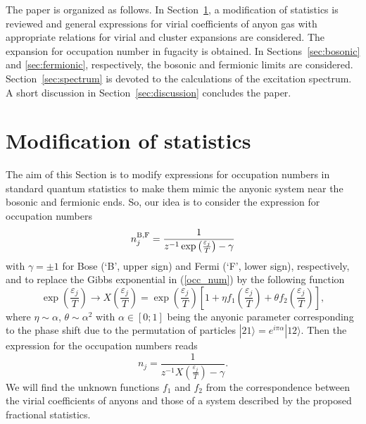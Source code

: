 \documentclass[12pt,a4paper]{article}
\def\eps{\varepsilon}
\begin{document}
The paper is organized as follows. In Section~\ref{sec:modif}, a modification of statistics is reviewed and general expressions for virial coefficients of anyon gas with appropriate relations for virial and cluster expansions are considered. The expansion for occupation number in fugacity is obtained. In Sections~\ref{sec:bosonic} and \ref{sec:fermionic}, respectively, the bosonic and fermionic limits are considered. Section~\ref{sec:spectrum} is devoted to the calculations of the excitation spectrum. A short discussion in Section~\ref{sec:discussion} concludes the paper.


\section{Modification of statistics}\label{sec:modif}
The aim of this Section is to modify expressions for occupation numbers in standard quantum statistics to make them mimic the anyonic system near the bosonic and fermionic ends. So, our idea is to consider the expression for occupation numbers 
\begin{equation}\label{occ_num}
n^{\rm B,F}_j=\frac{1}{z^{-1}\exp\left(\frac{\eps_{j}}{T}\right)-\gamma}
\end{equation}
with $\gamma=\pm1$ for Bose (`B', upper sign) and Fermi (`F', lower sign), respectively, and to replace the Gibbs exponential in (\ref{occ_num}) by the following function 
\begin{equation}
\exp\left(\frac{\eps_{j}}{T}\right) \rightarrow X\left(\frac{\eps_j}{T}\right)=\exp\left(\frac{\eps_{j}}{T}\right) \left[1+\eta f_1\left(\frac{\eps_{j}}{T}\right)+\theta f_2\left(\frac{\eps_{j}}{T}\right)\right],
\end{equation}
where $\eta\sim\alpha$, $\theta\sim\alpha^2$ with $\alpha\in[0;1]$ being the anyonic parameter corresponding to the phase shift due to the permutation of particles $|21\rangle = e^{i\pi\alpha}|12\rangle$. Then the expression for the occupation numbers reads
\begin{equation}\label{occ_num2}
n_j=\frac{1}{z^{-1}X\left(\frac{\eps_{j}}{T}\right)-\gamma}.
\end{equation}
We will find the unknown functions $f_1$ and $f_2$ from the correspondence between the virial coefficients of anyons and those of a system described by the proposed fractional statistics.
\end{document}
